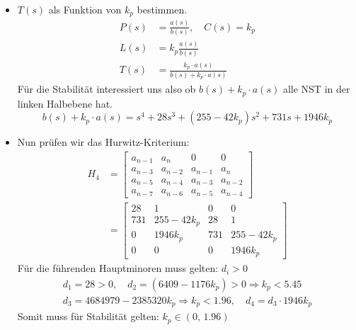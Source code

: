     \begin{itemize}
        \item $T(s)$ als Funktion von $k_p$ bestimmen.
            \begin{align*}
                P(s) &= \frac{a(s)}{b(s)},\quad C(s) = k_p\\
                L(s) &=  k_p\frac{a(s)}{b(s)}\\
                T(s) &=  \frac{k_p\cdot a(s)}{b(s) + k_p\cdot a(s)}
            \end{align*}
            Für die Stabilität interessiert uns also ob $b(s) + k_p\cdot a(s)$ alle NST in der linken Halbebene hat.
            \begin{equation*}
                b(s) + k_p\cdot a(s) = s^4 + 28s^3 + (255-42k_p)s^2 + 731s + 1946k_p
            \end{equation*}
        
        \item Nun prüfen wir das Hurwitz-Kriterium:
            \begin{align*}
                H_4 &= 
                \begin{bmatrix}
                a_{n-1} & a_n & 0 & 0\\
                a_{n-3} & a_{n-2} & a_{n-1} & a_n\\
                a_{n-5} & a_{n-4} & a_{n-3} & a_{n-2}\\
                a_{n-7} & a_{n-6} & a_{n-5} & a_{n-4}
                \end{bmatrix}\\
                &= 
                \begin{bmatrix}
                28 & 1 & 0 & 0\\
                731 & 255-42k_p & 28 & 1\\
                0 & 1946k_p &731 & 255-42k_p\\
                0   &   0   &   0   &   1946k_p
                \end{bmatrix}
            \end{align*}                                        
            Für die führenden Hauptminoren muss gelten: $d_i > 0$
            \begin{gather*}
                d_1 = 28 > 0,\quad  d_2 = (6409-1176k_p) > 0 \Rightarrow k_p < 5.45\\
                d_3 = 4684979-2385320k_p \Rightarrow k_p < 1.96,\quad d_4 = d_3\cdot1946k_p 
            \end{gather*}
            Somit muss für Stabilität gelten: $k_p\in(0,\,1.96)$
    \end{itemize}